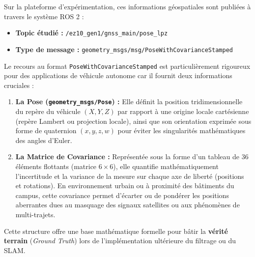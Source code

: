 \documentclass[12pt,a4paper,oneside]{report}
\begin{document}
\hspace*{0.5cm}Sur la plateforme d'expérimentation, ces informations géospatiales sont publiées à travers le système ROS 2 :\vspace{0.05cm}

\begin{itemize}[label=\textbullet, itemsep=0.5em]
    \item \textbf{Topic étudié :} \texttt{/ez10\_gen1/gnss\_main/pose\_lpz}
    \item \textbf{Type de message :} \texttt{geometry\_msgs/msg/PoseWithCovarianceStamped}
\end{itemize}

\vspace{0.5cm}

\hspace*{1cm}Le recours au format \texttt{PoseWithCovarianceStamped} est particulièrement rigoureux pour des applications de véhicule autonome car il fournit deux informations cruciales :\vspace{0.05cm}

\begin{enumerate}[itemsep=0.5em]
    \item \textbf{La Pose (\texttt{geometry\_msgs/Pose}) :} Elle définit la position tridimensionnelle du repère du véhicule $(X, Y, Z)$ par rapport à une origine locale cartésienne (repère Lambert ou projection locale), ainsi que son orientation exprimée sous forme de quaternion $(x, y, z, w)$ pour éviter les singularités mathématiques des angles d'Euler.
    \item \textbf{La Matrice de Covariance :} Représentée sous la forme d'un tableau de 36 éléments flottants (matrice $6 \times 6$), elle quantifie mathématiquement l'incertitude et la variance de la mesure sur chaque axe de liberté (positions et rotations). En environnement urbain ou à proximité des bâtiments du campus, cette covariance permet d'écarter ou de pondérer les positions aberrantes dues au masquage des signaux satellites ou aux phénomènes de multi-trajets.
\end{enumerate}

\vspace{0.5cm}

\hspace*{1cm}Cette structure offre une base mathématique formelle pour bâtir la \textbf{vérité terrain} (\textit{Ground Truth}) lors de l'implémentation ultérieure du filtrage ou du SLAM.
\end{document}
